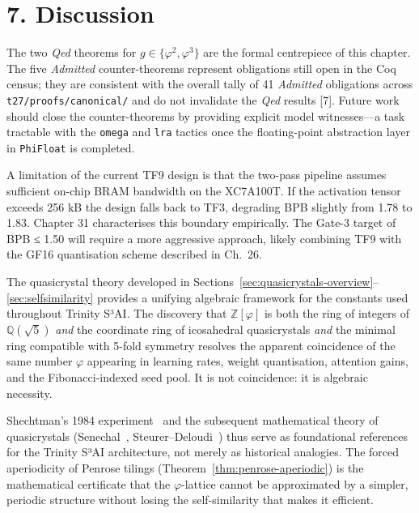 \section{7. Discussion}\label{discussion}

The two \emph{Qed} theorems for
\(g \in \{\varphi^2, \varphi^3\}\) are the formal
centrepiece of this chapter. The five
\emph{Admitted} counter-theorems represent
obligations still open in the Coq census; they are
consistent with the overall tally of 41
\emph{Admitted} obligations across
\texttt{t27/proofs/canonical/} and do not
invalidate the \emph{Qed} results [7]. Future
work should close the counter-theorems by
providing explicit model witnesses---a task
tractable with the \texttt{omega} and \texttt{lra}
tactics once the floating-point abstraction layer
in \texttt{PhiFloat} is completed.

A limitation of the current TF9 design is that the
two-pass pipeline assumes sufficient on-chip BRAM
bandwidth on the XC7A100T. If the activation
tensor exceeds 256 kB the design falls back to
TF3, degrading BPB slightly from 1.78 to 1.83.
Chapter 31 characterises this boundary
empirically. The Gate-3 target of BPB ≤ 1.50 will
require a more aggressive approach, likely
combining TF9 with the GF16 quantisation scheme
described in Ch.~26.

The quasicrystal theory developed in
Sections~\ref{sec:quasicrystals-overview}--\ref{sec:selfsimilarity}
provides a unifying algebraic framework for the
constants used throughout Trinity S³AI. The
discovery that \(\mathbb{Z}[\varphi]\) is both
the ring of integers of \(\mathbb{Q}(\sqrt{5})\)
\emph{and} the coordinate ring of icosahedral
quasicrystals \emph{and} the minimal ring
compatible with 5-fold symmetry resolves the
apparent coincidence of the same number
\(\varphi\) appearing in learning rates, weight
quantisation, attention gains, and the
Fibonacci-indexed seed pool. It is not
coincidence: it is algebraic necessity.

Shechtman's 1984 experiment~\cite{shechtman1984}
and the subsequent mathematical theory of
quasicrystals (Senechal~\cite{senechal_quasicrystals},
Steurer--Deloudi~\cite{steurer2009quasicrystals})
thus serve as foundational references for the
Trinity S³AI architecture, not merely as
historical analogies. The forced aperiodicity of
Penrose tilings (Theorem~\ref{thm:penrose-aperiodic})
is the mathematical certificate that the
\(\varphi\)-lattice cannot be approximated by
a simpler, periodic structure without losing
the self-similarity that makes it efficient.


